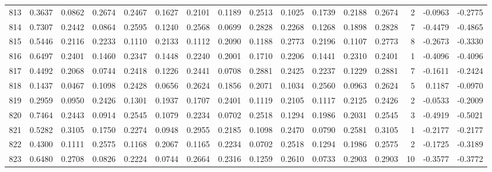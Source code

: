 \begin{tabular}{lrrrrrrrrrrrrrrr}
813 &      0.3637 &  0.0862 &  0.2674 &  0.2467 &  0.1627 &  0.2101 &  0.1189 &  0.2513 &  0.1025 &  0.1739 &   0.2188 &     0.2674 &      2 &                   -0.0963 &                    -0.2775 \\
814 &      0.7307 &  0.2442 &  0.0864 &  0.2595 &  0.1240 &  0.2568 &  0.0699 &  0.2828 &  0.2268 &  0.1268 &   0.1898 &     0.2828 &      7 &                   -0.4479 &                    -0.4865 \\
815 &      0.5446 &  0.2116 &  0.2233 &  0.1110 &  0.2133 &  0.1112 &  0.2090 &  0.1188 &  0.2773 &  0.2196 &   0.1107 &     0.2773 &      8 &                   -0.2673 &                    -0.3330 \\
816 &      0.6497 &  0.2401 &  0.1460 &  0.2347 &  0.1448 &  0.2240 &  0.2001 &  0.1710 &  0.2206 &  0.1441 &   0.2310 &     0.2401 &      1 &                   -0.4096 &                    -0.4096 \\
817 &      0.4492 &  0.2068 &  0.0744 &  0.2418 &  0.1226 &  0.2441 &  0.0708 &  0.2881 &  0.2425 &  0.2237 &   0.1229 &     0.2881 &      7 &                   -0.1611 &                    -0.2424 \\
818 &      0.1437 &  0.0467 &  0.1098 &  0.2428 &  0.0656 &  0.2624 &  0.1856 &  0.2071 &  0.1034 &  0.2560 &   0.0963 &     0.2624 &      5 &                    0.1187 &                    -0.0970 \\
819 &      0.2959 &  0.0950 &  0.2426 &  0.1301 &  0.1937 &  0.1707 &  0.2401 &  0.1119 &  0.2105 &  0.1117 &   0.2125 &     0.2426 &      2 &                   -0.0533 &                    -0.2009 \\
820 &      0.7464 &  0.2443 &  0.0914 &  0.2545 &  0.1079 &  0.2234 &  0.0702 &  0.2518 &  0.1294 &  0.1986 &   0.2031 &     0.2545 &      3 &                   -0.4919 &                    -0.5021 \\
821 &      0.5282 &  0.3105 &  0.1750 &  0.2274 &  0.0948 &  0.2955 &  0.2185 &  0.1098 &  0.2470 &  0.0790 &   0.2581 &     0.3105 &      1 &                   -0.2177 &                    -0.2177 \\
822 &      0.4300 &  0.1111 &  0.2575 &  0.1168 &  0.2067 &  0.1165 &  0.2234 &  0.0702 &  0.2518 &  0.1294 &   0.1986 &     0.2575 &      2 &                   -0.1725 &                    -0.3189 \\
823 &      0.6480 &  0.2708 &  0.0826 &  0.2224 &  0.0744 &  0.2664 &  0.2316 &  0.1259 &  0.2610 &  0.0733 &   0.2903 &     0.2903 &     10 &                   -0.3577 &                    -0.3772 \\

\end{tabular}

